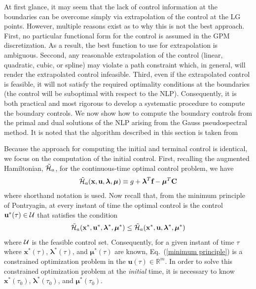 \documentclass[10pt,final]{report}
\begin{document}
At first glance, it may seem that the lack of control information at the
boundaries can be overcome simply via extrapolation of the control at the LG
points.  However, multiple reasons exist as to why this is not the best
approach.  First, no particular functional form for the control is assumed in
the GPM discretization.  As a result, the best function to use for
extrapolation is ambiguous.  Seccond, any reasonable extrapolation of the
control (\eg linear, quadratic, cubic, or spline) may violate a path
constraint which, in general, will render the extrapolated control infeasible.
Third, even if the extrapolated control is feasible, it will not satisfy the
required optimality conditions at the boundaries (\ie the control will be
suboptimal with respect to the NLP).  Consequently, it is both practical and
most rigorous to develop a systematic procedure to compute the boundary
controls.  We now show how to compute the boundary controls from the primal
and dual solutions of the NLP arising from the Gauss pseudospectral method.
It is noted that the algorithm described in this section is taken from

Because the approach for computing the initial and terminal control is
identical, we focus on the computation of the initial control.  First,
recalling the augmented Hamiltonian,  $\tilde{\cal{H}}_a$, for the
continuous-time optimal control problem, we have
\begin{equation}\label{augmented Hamiltonian continuous}
  \tilde{\cal H}_a(\textbf{x},\textbf{u},\boldsymbol{\lambda},\boldsymbol{\mu})
  \equiv g + \boldsymbol{\lambda}^T\textbf{f} -
  \boldsymbol{\mu}^T\textbf{C}
\end{equation}
where shorthand notation is used.  Now recall that, from the minimum principle
of Pontryagin, at  every instant of time the optimal control is the control
$\mathbf{u}^*(\tau)\in{\cal U}$ that satisfies the condition
\begin{equation}\label{minimum principle}
  \tilde{\cal H}_a(\textbf{x}^*,\textbf{u}^*,\boldsymbol{\lambda}^*,\boldsymbol{\mu}^*)
  \leq
  \tilde{\cal H}_a(\textbf{x}^*,\textbf{u},\boldsymbol{\lambda}^*,\boldsymbol{\mu}^*)
\end{equation}
where ${\cal U}$ is the feasible control set.  Consequently, for a
given instant of time $\tau$ where $\textbf{x}^*(\tau)$, $\boldsymbol{\lambda}^*(\tau)$,
and $\boldsymbol{\mu}^*(\tau)$ are known, Eq.~(\ref{minimum principle}) is a
constrained optimization problem in the
$\textbf{u}(\tau)\in\mathbb{R}^m$.  In order to solve this
constrained optimization problem at the {\em initial}
time, it is necessary to know $\textbf{x}^*(\tau_0)$,
$\boldsymbol{\lambda}^*(\tau_0)$, and $\boldsymbol{\mu}^*(\tau_0)$.
\end{document}
